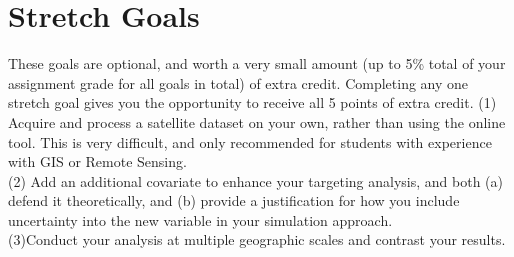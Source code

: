 \documentclass[a4paper, 11pt]{article}
\begin{document}
\section{Stretch Goals}
These goals are optional, and worth a very small amount (up to 5\% total of your assignment grade for all goals in total) of extra credit.  Completing any one stretch goal gives you the opportunity to receive all 5 points of extra credit.
(1) Acquire and process a satellite dataset on your own, rather than using the online tool.  This is very difficult, and only recommended for students with experience with GIS or Remote Sensing.\\
(2) Add an additional covariate to enhance your targeting analysis, and both (a) defend it theoretically, and (b) provide a justification for how you include uncertainty into the new variable in your simulation approach.\\
(3)Conduct your analysis at multiple geographic scales and contrast your results.
\end{document}
